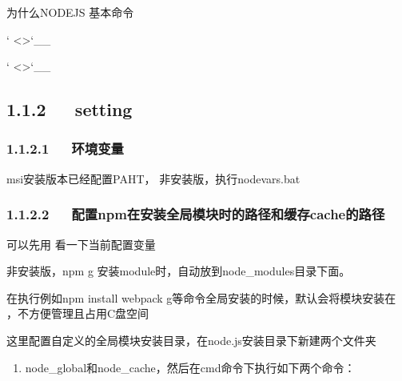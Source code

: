 \documentclass[letterpaper,12pt,english]{sphinxmanual}
\begin{document}

为什么NODEJS 基本命令 

` <>`\_\_

` <>`\_\_


\subsection{1.1.2   setting}
\label{\detokenize{001software/001install/001._u7f51_u7ad9/nodeJs:setting}}

\subsubsection{1.1.2.1   环境变量}
\label{\detokenize{001software/001install/001._u7f51_u7ad9/nodeJs:id2}}
msi安装版本已经配置PAHT，
非安装版，执行nodevars.bat


\subsubsection{1.1.2.2   配置npm在安装全局模块时的路径和缓存cache的路径}
\label{\detokenize{001software/001install/001._u7f51_u7ad9/nodeJs:npmcache}}
可以先用  看一下当前配置变量

非安装版，npm \sphinxhyphen{}g 安装module时，自动放到node\_modules目录下面。


在执行例如npm install webpack \sphinxhyphen{}g等命令全局安装的时候，默认会将模块安装在  ，不方便管理且占用C盘空间

这里配置自定义的全局模块安装目录，在node.js安装目录下新建两个文件夹
\begin{enumerate}
%
\item {} 
node\_global和node\_cache，然后在cmd命令下执行如下两个命令：

\end{enumerate}
\end{document}
